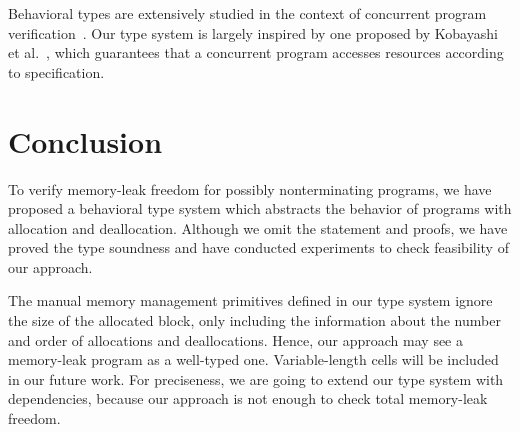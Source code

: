 \documentclass{sigplanconf}
\begin{document}
Behavioral types are extensively studied in the context of concurrent
program
verification~\cite{DBLP:conf/esop/HondaVK98,DBLP:journals/tcs/IgarashiK04,DBLP:conf/esop/VieiraCS08,DBLP:journals/lmcs/KobayashiSW06}.
Our type system is largely inspired by one proposed by Kobayashi et
al.~\cite{DBLP:journals/lmcs/KobayashiSW06}, which guarantees that a
concurrent program accesses resources according to specification.

\section{Conclusion}
To verify memory-leak freedom for possibly nonterminating programs, we
have proposed a behavioral type system which abstracts the behavior of
programs with allocation and deallocation. Although we omit the
statement and proofs, we have proved the type soundness and have
conducted experiments to check feasibility of our approach.

The manual memory management primitives defined in our type system
ignore the size of the allocated block, only including the information
about the number and order of allocations and deallocations.  Hence,
our approach may see a memory-leak program as a well-typed one.
Variable-length cells will be included in our future work. For
preciseness, we are going to extend our type system with dependencies,
because our approach is not enough to check total memory-leak freedom.


 
\end{document}
